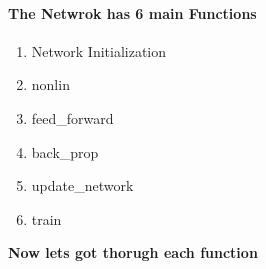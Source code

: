 \documentclass[11pt]{article}
\providecommand{\tightlist}{%
      \setlength{\itemsep}{0pt}\setlength{\parskip}{0pt}}
\begin{document}
\paragraph{The Netwrok has 6 main
Functions}\label{the-netwrok-has-6-main-functions}

\begin{enumerate}
\def\labelenumi{\arabic{enumi})}
\tightlist
\item
  Network Initialization
\item
  nonlin
\item
  feed\_forward
\item
  back\_prop
\item
  update\_network
\item
  train
\end{enumerate}

\textbf{Now lets got thorugh each function}
\end{document}
